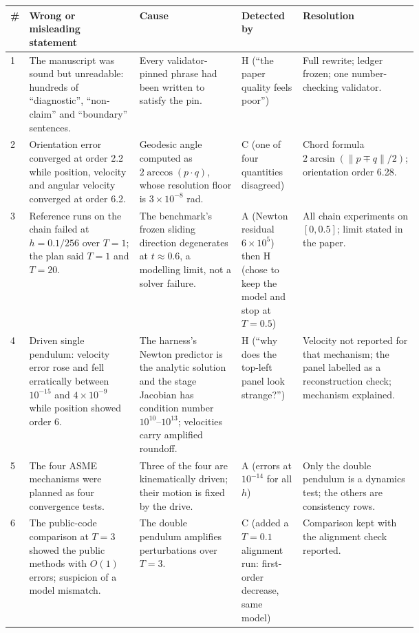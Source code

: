 \begin{table}[t]
\centering
\scriptsize
\begin{tabularx}{\textwidth}{@{}P{0.02\linewidth}P{0.27\linewidth}P{0.25\linewidth}P{0.15\linewidth}Y@{}}
\toprule
\# & Wrong or misleading statement & Cause & Detected by & Resolution \\
 & The manuscript was sound but unreadable: hundreds of ``diagnostic'', ``non-claim'' and
``boundary'' sentences. & Every validator-pinned phrase had been written to satisfy the pin. & H
(``the paper quality feels poor'') & Full rewrite; ledger frozen; one number-checking validator. \\
2 & Orientation error converged at order 2.2 while position, velocity and angular velocity
converged at order 6.2. & Geodesic angle computed as $2\arccos(p\cdot q)$, whose resolution floor
is $3\times10^{-8}$ rad. & C (one of four quantities disagreed) & Chord formula
$2\arcsin(\lVert p\mp q\rVert/2)$; orientation order 6.28. \\
3 & Reference runs on the chain failed at $h=0.1/256$ over $T=1$; the plan said $T=1$ and
$T=20$. & The benchmark's frozen sliding direction degenerates at $t\approx0.6$,
a modelling limit, not a solver failure. & A (Newton residual $6\times10^{5}$) then H (chose to
keep the model and stop at $T=0.5$) & All chain experiments on $[0,0.5]$; limit stated in the
paper. \\
4 & Driven single pendulum: velocity error rose and fell erratically between $10^{-15}$ and
$4\times10^{-9}$ while position showed order 6. & The harness's Newton predictor is the analytic
solution and the stage Jacobian has condition number $10^{10}$--$10^{13}$; velocities carry
amplified roundoff. & H (``why does the top-left panel look strange?'') & Velocity not reported for
that mechanism; the panel labelled as a reconstruction check; mechanism explained. \\
5 & The four ASME mechanisms were planned as four convergence tests. & Three of the four are
kinematically driven; their motion is fixed by the drive. & A (errors at $10^{-14}$ for all $h$) &
Only the double pendulum is a dynamics test; the others are consistency rows. \\
6 & The public-code comparison at $T=3$ showed the public methods with $O(1)$ errors; suspicion of
a model mismatch. & The double pendulum amplifies perturbations over $T=3$. & C (added a $T=0.1$
alignment run: first-order decrease, same model) & Comparison kept with the alignment check
reported. \\

\end{tabularx}
\end{table}
